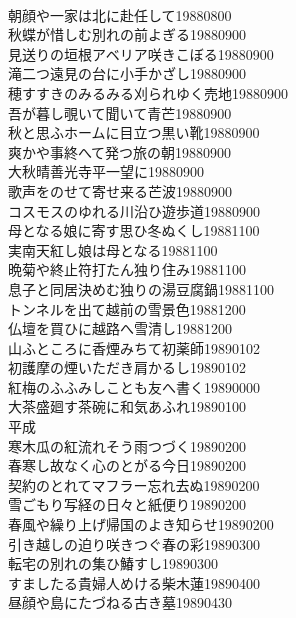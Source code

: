 \begin{multicols}{2}
\\朝顔や一家は北に赴任して\hfill{19880800}
\\秋蝶が惜しむ別れの前よぎる\hfill{19880900}
\\見送りの垣根アベリア咲きこぼる\hfill{19880900}
\\滝二つ遠見の台に小手かざし\hfill{19880900}
\\穂すすきのみるみる刈られゆく売地\hfill{19880900}
\\吾が暮し覗いて聞いて青芒\hfill{19880900}
\\秋と思ふホームに目立つ黒い靴\hfill{19880900}
\\爽かや事終へて発つ旅の朝\hfill{19880900}
\\大秋晴善光寺平一望に\hfill{19880900}
\\歌声をのせて寄せ来る芒波\hfill{19880900}
\\コスモスのゆれる川沿ひ遊歩道\hfill{19880900}
\\母となる娘に寄す思ひ冬ぬくし\hfill{19881100}
\\実南天紅し娘は母となる\hfill{19881100}
\\晩菊や終止符打たん独り住み\hfill{19881100}
\\息子と同居決めむ独りの湯豆腐鍋\hfill{19881100}
\\トンネルを出て越前の雪景色\hfill{19881200}
\\仏壇を買ひに越路へ雪清し\hfill{19881200}
\\山ふところに香煙みちて初薬師\hfill{19890102}
\\初護摩の煙いただき肩かるし\hfill{19890102}
\\紅梅のふふみしことも友へ書く\hfill{19890000}
\\大茶盛廻す茶碗に和気あふれ\hfill{19890100}
\\平成
\\寒木瓜の紅流れそう雨つづく\hfill{19890200}
\\春寒し故なく心のとがる今日\hfill{19890200}
\\契約のとれてマフラー忘れ去ぬ\hfill{19890200}
\\雪ごもり写経の日々と紙便り\hfill{19890200}
\\春風や繰り上げ帰国のよき知らせ\hfill{19890200}
\\引き越しの迫り咲きつぐ春の彩\hfill{19890300}
\\転宅の別れの集ひ鰆すし\hfill{19890300}
\\すましたる貴婦人めける柴木蓮\hfill{19890400}
\\昼顔や島にたづねる古き墓\hfill{19890430}

\end{multicols}
